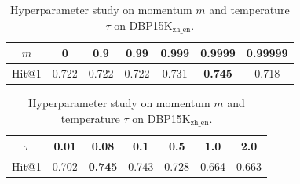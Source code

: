 \begin{table}[t]
\caption{Hyperparameter study on momentum $m$ and temperature $\tau$ on DBP15K$_{\text{zh\_en}}$.}
\centering
\begin{subtable}
    \centering
    \begin{tabular}{@{}ccccccc@{}}
        \toprule[1.5pt]
        \multicolumn{1}{c|}{$m$} &
        \multicolumn{1}{c|}{0} &
        \multicolumn{1}{c|}{0.9} &
          \multicolumn{1}{c|}{0.99} &
          \multicolumn{1}{c|}{0.999} &
          \multicolumn{1}{c|}{0.9999} &
          \multicolumn{1}{c}{0.99999}
          \\ \midrule
        \multicolumn{1}{c|}{Hit@1} &
          \multicolumn{1}{c|}{0.722} &
          \multicolumn{1}{c|}{0.722} &
          \multicolumn{1}{c|}{0.722} &
          \multicolumn{1}{c|}{0.731} &
          \multicolumn{1}{c|}{\bf 0.745} &
          \multicolumn{1}{c}{0.718} \\
        \bottomrule[1.5pt]
        \end{tabular}
\end{subtable}

\begin{subtable}
    \centering
    \begin{tabular}{@{}ccccccc@{}}
        \toprule[1.5pt]
        \multicolumn{1}{c|}{$\tau$} &
        \multicolumn{1}{c|}{0.01} &
          \multicolumn{1}{c|}{0.08} &
          \multicolumn{1}{c|}{0.1} &
          \multicolumn{1}{c|}{0.5} &
          \multicolumn{1}{c|}{1.0} &
          \multicolumn{1}{c}{2.0} \\ \midrule
        \multicolumn{1}{c|}{Hit@1} &
          \multicolumn{1}{c|}{0.702} &
          \multicolumn{1}{c|}{\bf 0.745} &
          \multicolumn{1}{c|}{0.743} &
          \multicolumn{1}{c|}{0.728} &
          \multicolumn{1}{c|}{0.664} &
          \multicolumn{1}{c}{0.663}\\
        \bottomrule[1.5pt]
        \end{tabular}
    \end{subtable}
\label{tab:param}
\end{table}
